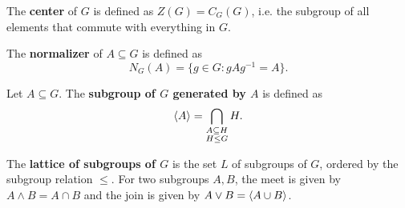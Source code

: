 \documentclass[class=report, crop=false]{standalone}
\begin{document}
\begin{boxedenv}\begin{definition}
    The \textbf{center} of $G$ is defined as $Z(G)=C_G(G)$, i.e. the subgroup of all elements that commute with everything in $G$.
\end{definition}\end{boxedenv}

\begin{boxedenv}\begin{definition}
    The \textbf{normalizer} of $A\subseteq G$ is defined as
    \[N_G(A)=\{g\in G: gAg^{-1} = A\}.\]
\end{definition}\end{boxedenv}

\begin{boxedenv}\begin{definition}
    Let $A\subseteq G$. The \textbf{subgroup of $G$ generated by $A$} is defined as
    \[\left\langle A\right\rangle=\bigcap_{\substack{A\subseteq H\\ H\leq G}} H.\]
\end{definition}\end{boxedenv}

\begin{boxedenv}\begin{definition}
    The \textbf{lattice of subgroups of $G$} is the set $L$ of subgroups of $G$, ordered by the subgroup relation $\le$. For two subgroups $A,B$, the meet is given by $A\land B=A\cap B$ and the join is given by $A\lor B=\left\langle A\cup B\right\rangle$.
\end{definition}\end{boxedenv}
\end{document}
